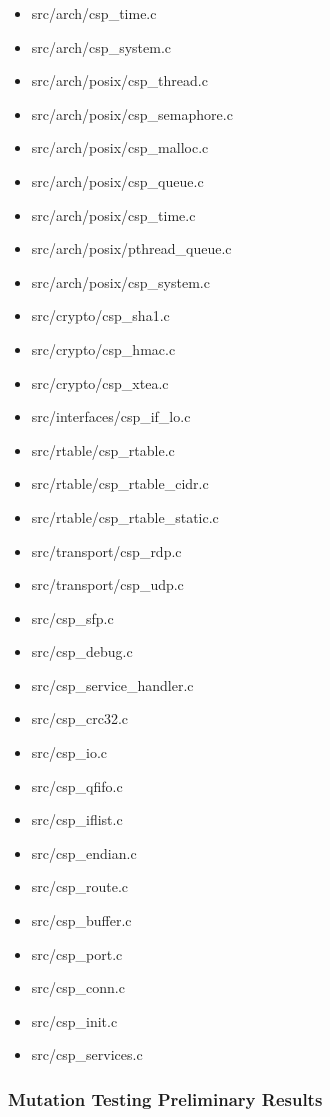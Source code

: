 \begin{enumerate}

	\begin{itemize}
		\item src/arch/csp\_time.c
		\item src/arch/csp\_system.c
		\item src/arch/posix/csp\_thread.c
		\item src/arch/posix/csp\_semaphore.c
		\item src/arch/posix/csp\_malloc.c
		\item src/arch/posix/csp\_queue.c
		\item src/arch/posix/csp\_time.c
		\item src/arch/posix/pthread\_queue.c
		\item src/arch/posix/csp\_system.c
		\item src/crypto/csp\_sha1.c
		\item src/crypto/csp\_hmac.c
		\item src/crypto/csp\_xtea.c
		\item src/interfaces/csp\_if\_lo.c
		\item src/rtable/csp\_rtable.c
		\item src/rtable/csp\_rtable\_cidr.c
		\item src/rtable/csp\_rtable\_static.c
		\item src/transport/csp\_rdp.c
		\item src/transport/csp\_udp.c
		\item src/csp\_sfp.c
		\item src/csp\_debug.c
		\item src/csp\_service\_handler.c
		\item src/csp\_crc32.c
		\item src/csp\_io.c
		\item src/csp\_qfifo.c
		\item src/csp\_iflist.c
		\item src/csp\_endian.c
		\item src/csp\_route.c
		\item src/csp\_buffer.c
		\item src/csp\_port.c
		\item src/csp\_conn.c
		\item src/csp\_init.c
		\item src/csp\_services.c
	\end{itemize}


\end{enumerate}

\subsubsection{Mutation Testing Preliminary Results}


